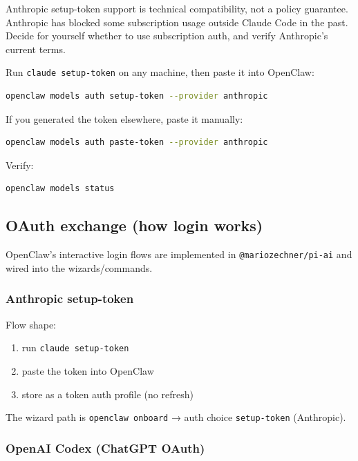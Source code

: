 Anthropic setup-token support is technical compatibility, not a policy guarantee.
Anthropic has blocked some subscription usage outside Claude Code in the past.
Decide for yourself whether to use subscription auth, and verify Anthropic's current terms.

Run \texttt{claude setup-token} on any machine, then paste it into OpenClaw:

\begin{lstlisting}[language=bash]
openclaw models auth setup-token --provider anthropic
\end{lstlisting}


If you generated the token elsewhere, paste it manually:

\begin{lstlisting}[language=bash]
openclaw models auth paste-token --provider anthropic
\end{lstlisting}


Verify:

\begin{lstlisting}[language=bash]
openclaw models status
\end{lstlisting}


\subsection{OAuth exchange (how login works)}


OpenClaw’s interactive login flows are implemented in \texttt{@mariozechner/pi-ai} and wired into the wizards/commands.

\subsubsection{Anthropic setup-token}


Flow shape:

\begin{enumerate}
  \item run \texttt{claude setup-token}
  \item paste the token into OpenClaw
  \item store as a token auth profile (no refresh)
\end{enumerate}


The wizard path is \texttt{openclaw onboard} → auth choice \texttt{setup-token} (Anthropic).

\subsubsection{OpenAI Codex (ChatGPT OAuth)}


